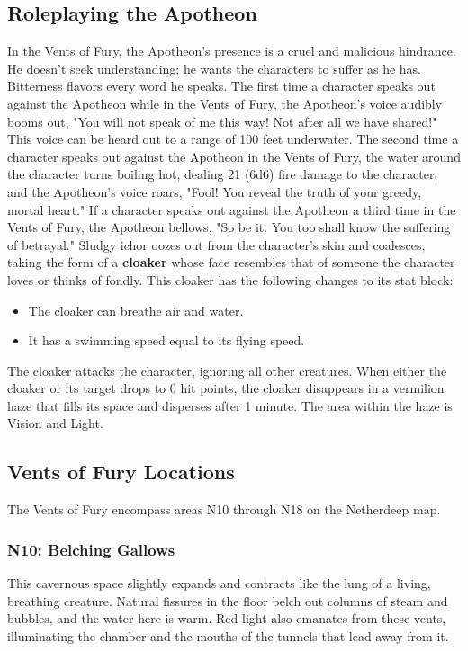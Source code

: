 \documentclass[10pt,a4,twoside,twocolumn,openany,nodeprecatedcode]{dndbook}
\begin{document}
\subsection{Roleplaying the Apotheon}
In the Vents of Fury, the Apotheon's presence is a cruel and malicious hindrance. He doesn't seek understanding; he wants the characters to suffer as he has. Bitterness flavors every word he speaks.
The first time a character speaks out against the Apotheon while in the Vents of Fury, the Apotheon's voice audibly booms out, "You will not speak of me this way! Not after all we have shared!" This voice can be heard out to a range of 100 feet underwater.
The second time a character speaks out against the Apotheon in the Vents of Fury, the water around the character turns boiling hot, dealing 21 (6d6) fire damage to the character, and the Apotheon's voice roars, "Fool! You reveal the truth of your greedy, mortal heart."
If a character speaks out against the Apotheon a third time in the Vents of Fury, the Apotheon bellows, "So be it. You too shall know the suffering of betrayal." Sludgy ichor oozes out from the character's skin and coalesces, taking the form of a \textbf{cloaker} whose face resembles that of someone the character loves or thinks of fondly. This cloaker has the following changes to its stat block:
\begin{itemize}

\item The cloaker can breathe air and water.
\item It has a swimming speed equal to its flying speed.
\end{itemize}


The cloaker attacks the character, ignoring all other creatures. When either the cloaker or its target drops to 0 hit points, the cloaker disappears in a vermilion haze that fills its space and disperses after 1 minute. The area within the haze is Vision and Light.
\subsection{Vents of Fury Locations}
The Vents of Fury encompass areas N10 through N18 on the Netherdeep map.
\subsubsection{N10: Belching Gallows}
\begin{DndReadAloud}{}
This cavernous space slightly expands and contracts like the lung of a living, breathing creature. Natural fissures in the floor belch out columns of steam and bubbles, and the water here is warm. Red light also emanates from these vents, illuminating the chamber and the mouths of the tunnels that lead away from it.
\end{DndReadAloud}
\end{document}
